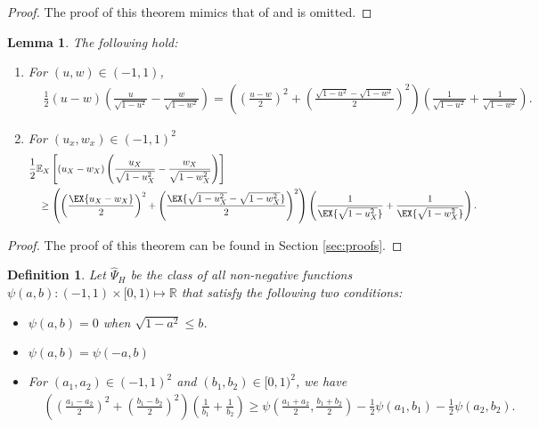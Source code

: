\documentclass[conference,letterpaper,onecolumn]{IEEEtran}
\theoremstyle{plain}%
\newtheorem{lemma}[thm]{Lemma}
\newtheorem{definition}{Definition}
\begin{document}
\begin{proof}
    The proof of this theorem mimics that of  and is omitted.
\end{proof}

\begin{lemma}
\label{lem:twopoint}
The following hold:
\begin{enumerate}[leftmargin=*]
    \item For $(u,w) \in (-1,1)$,
    {\begin{align*}
        &\frac{1}{2}  (u - w)\left(\frac{u}{\sqrt{1-u^2}} - \frac{w}{\sqrt{1-w^2}} \right)= \left(\left(\frac{u-w}{2}\right)^2 + \left(\frac{\sqrt{1-u^2}-\sqrt{1-w^2}}{2}\right)^2\right) \left(\frac{1}{\sqrt{1-u^2}} + \frac{1}{\sqrt{1-w^2}} \right).
    \end{align*}}
    \item For $(u_x,w_x)\in(-1,1)^2$
    { \begin{align*}
        &\frac{1}{2}\mathbb{E}_X\left[(u_X-w_X)\left(\frac{u_X}{\sqrt{1-u_X^2}} - \frac{w_X}{\sqrt{1-w_X^2}}\right)\right]\\&\quad\geq \left(\left(\frac{\EX{u_X-w_X}}{2}\right)^2 + \left(\frac{\EX{\sqrt{1-u_X^2}-\sqrt{1-w_X^2}}}{2}\right)^2\right)\left(\frac{1}{\EX{\sqrt{1-u_X^2}}} + \frac{1}{\EX{\sqrt{1-w_X^2}}} \right).
    \end{align*}}
\end{enumerate}
    
\end{lemma}

\begin{proof}
    The proof of this theorem can be found in Section \ref{sec:proofs}.
\end{proof}

\begin{definition}Let $\hat{\Psi}_H$ be the class of all non-negative functions $\psi(a,b):(-1,1)\times [0,1)\mapsto \mathbb{R}$ that satisfy the following two conditions:
\begin{itemize}
    \item 
    $\psi(a,b)=0$ when $\sqrt{1-a^2}\leq b$. 
    \item $\psi(a,b)=\psi(-a,b)$
    \item For $(a_1,a_2) \in (-1,1)^2$ and $(b_1,b_2)\in [0,1)^2$, we have
    { \begin{align*}
       & \left(\left(\frac{a_1 - a_2}{2}\right)^2 + \left(\frac{b_1-b_2}{2}\right)^2\right)\left(\frac{1}{b_1} + \frac{1}{b_2} \right)  \geq \psi\left( \frac{a_1+a_2}{2},\frac{b_1+b_2}{2}\right) -\frac 12 \psi(a_1,b_1) - \frac 12 \psi(a_2,b_2).
    \end{align*}}
\end{itemize}
\end{definition}
\end{document}
